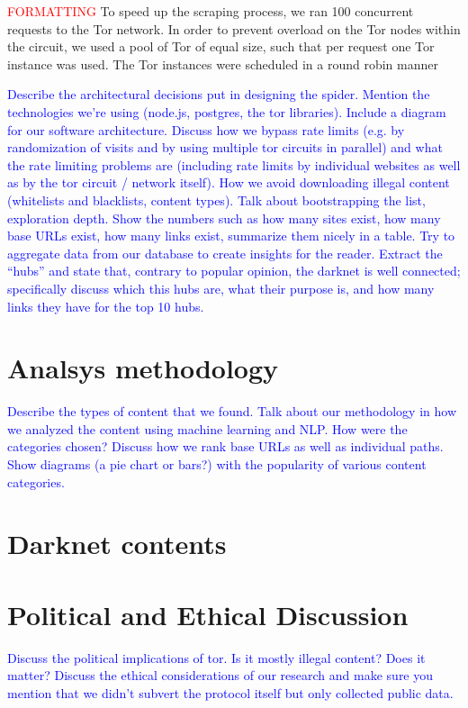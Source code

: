 \documentclass[USenglish,oneside,twocolumn]{article}
\newcommand\TODO[1]{\textcolor{red}{#1}}
\newcommand\CONTENT[1]{\textcolor{blue}{#1}}
\begin{document}
\TODO{FORMATTING}
To speed up the scraping process, we ran 100 concurrent requests to the Tor network. In order to prevent overload on the Tor nodes within the circuit, we used a pool of Tor of equal size, such that per request one Tor instance was used. The Tor instances were scheduled in a round robin manner 

\CONTENT{Describe the architectural decisions put in designing the spider. Mention the technologies we’re using (node.js, postgres, the tor libraries). Include a diagram for our software architecture. Discuss how we bypass rate limits (e.g. by randomization of visits and by using multiple tor circuits in parallel) and what the rate limiting problems are (including rate limits by individual websites as well as by the tor circuit / network itself). How we avoid downloading illegal content (whitelists and blacklists, content types). Talk about bootstrapping the list, exploration depth. Show the numbers such as how many sites exist, how many base URLs exist, how many links exist, summarize them nicely in a table. Try to aggregate data from our database to create insights for the reader. Extract the “hubs” and state that, contrary to popular opinion, the darknet is well connected; specifically discuss which this hubs are, what their purpose is, and how many links they have for the top 10 hubs.}


\section{Analsys methodology}

\CONTENT{Describe the types of content that we found. Talk about our methodology in how we analyzed the content using machine learning and NLP. How were the categories chosen? Discuss how we rank base URLs as well as individual paths. Show diagrams (a pie chart or bars?) with the popularity of various content categories.}

\section{Darknet contents}

\section{Political and Ethical Discussion}

\CONTENT{Discuss the political implications of tor. Is it mostly illegal content? Does it matter? Discuss the ethical considerations of our research and make sure you mention that we didn’t subvert the protocol itself but only collected public data.}
\end{document}
